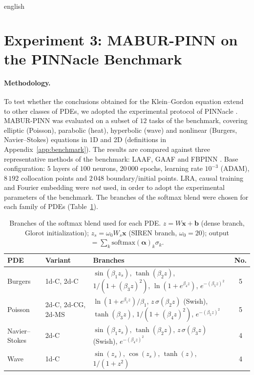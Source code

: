 \documentclass[../0000.tex]{subfiles}
\begin{document}
\begin{hyphenrules}{english}
\section{Experiment 3: MABUR-PINN on the PINNacle Benchmark}\label{sec:exp-benchmark}

\paragraph{Methodology.}
To test whether the conclusions obtained for the Klein--Gordon equation extend to other classes of
PDEs, we adopted the experimental protocol of PINNacle \cite{hao2024pinnacle}. MABUR-PINN was evaluated
on a subset of $12$ tasks of the benchmark, covering elliptic (Poisson), parabolic (heat), hyperbolic
(wave) and nonlinear (Burgers, Navier--Stokes) equations in 1D and 2D (definitions in
Appendix~\ref{app:benchmark}). The results are compared against three representative methods of the benchmark:
LAAF, GAAF \cite{jagtap2020a,jagtap2020b} and FBPINN \cite{moseley2023}. Base configuration:
$5$ layers of $100$ neurons, $20\,000$ epochs, learning rate $10^{-3}$ (ADAM), $8\,192$ collocation points
and $2\,048$ boundary/initial points. LRA, causal training and Fourier embedding were \emph{not} used, in
order to adopt the experimental parameters of the benchmark. The branches of the softmax blend were chosen
for each family of PDEs (Table~\ref{tab:benchmark-activations}).

\begin{table}[htbp]
  \centering
  \caption[Branches of the softmax blend used for each PDE]{Branches of the softmax blend used for each PDE. $z=W\mathbf{x}+\mathbf{b}$ (dense branch, Glorot
  initialization); $z_s=\omega_0W_s\mathbf{x}$ (SIREN branch, $\omega_0=20$); output
  $=\sum_k\mathrm{softmax}(\bm\alpha)_k\sigma_k$.}
  \label{tab:benchmark-activations}
  \small
  \begin{tabularx}{\linewidth}{@{}llXc@{}}
    \toprule
    PDE & Variant & Branches & No. \\
    \midrule
    Burgers & 1d-C, 2d-C & $\sin(\beta_1z_s)$, $\tanh(\beta_2z)$, $1/(1+(\beta_3z)^2)$, $\ln(1+e^{\beta_4z})$, $e^{-(\beta_5z)^2}$ & 5 \\
    Poisson & 2d-C, 2d-CG, 2d-MS & $\ln(1+e^{\beta_1z})/\beta_1$, $z\,\sigma(\beta_2z)$ (Swish), $\tanh(\beta_3z)$, $1/(1+(\beta_4z)^2)$, $e^{-(\beta_5z)^2}$ & 5 \\
    Navier--Stokes & 2d-C & $\sin(\beta_1z_s)$, $\tanh(\beta_2z)$, $z\,\sigma(\beta_3z)$ (Swish), $e^{-(\beta_4z)^2}$ & 4 \\
    Wave & 1d-C & $\sin(z_s)$, $\cos(z_s)$, $\tanh(z)$, $1/(1+z^2)$ & 4 \\
    \bottomrule
  \end{tabularx}
\end{table}


\end{hyphenrules}
\end{document}
